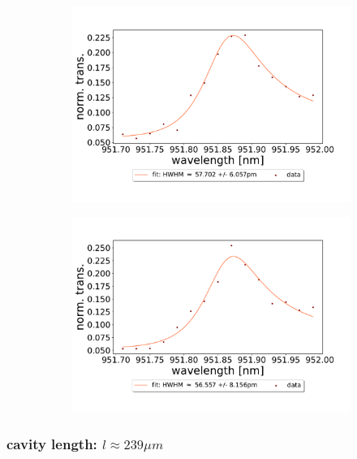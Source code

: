 \begin{figure}[h!]
\begin{subfigure}[b]{0.49\textwidth}
        \includegraphics[width=\textwidth]{figures/results/double fano fits/320um_M3:M5_fit_5.pdf}
        \caption{}
        \label{fig:320um_M3:M5_fit_5}
    \end{subfigure}
    \begin{subfigure}[b]{0.49\textwidth}
        \includegraphics[width=\textwidth]{figures/results/double fano fits/320um_M3:M5_fit_6.pdf}
        \caption{}
        \label{fig:320um_M3:M5_fit_6}
    \end{subfigure}
\end{figure}

\clearpage
\subsubsection*{cavity length: $l \approx 239 \mu m$}

